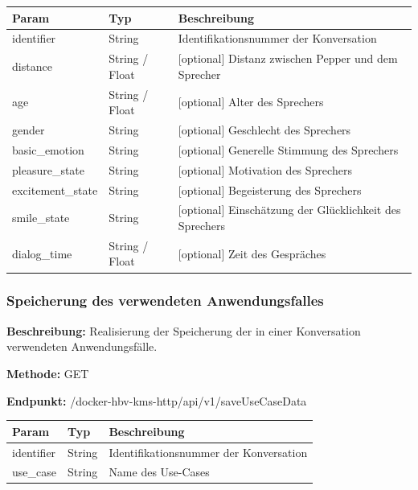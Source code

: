 \begin{table}[H]
    \setlength{\tabcolsep}{3pt}
    \begin{tabular}{p{100pt}p{80pt}p{200pt}}
        \hline
        Param             & Typ            & Beschreibung                                            \\
        \hline
        identifier        & String         & Identifikationsnummer der Konversation                  \\
        distance          & String / Float & [optional] Distanz zwischen Pepper und dem Sprecher     \\
        age               & String / Float & [optional] Alter des Sprechers                          \\
        gender            & String         & [optional] Geschlecht des Sprechers                     \\
        basic\_emotion    & String         & [optional] Generelle Stimmung des Sprechers             \\
        pleasure\_state   & String         & [optional] Motivation des Sprechers                     \\
        excitement\_state & String         & [optional] Begeisterung des Sprechers                   \\
        smile\_state      & String         & [optional] Einschätzung der Glücklichkeit des Sprechers \\
        dialog\_time      & String / Float & [optional] Zeit des Gespräches                          \\
        \hline
    \end{tabular}
\end{table}

\dotfill

\subsubsection{Speicherung des verwendeten Anwendungsfalles}
\label{sec:api-saveUseCaseData}
\textbf{Beschreibung:} Realisierung der Speicherung der in einer Konversation verwendeten Anwendungsfälle.

\textbf{Methode:} GET

\textbf{Endpunkt:} /docker-hbv-kms-http/api/v1/saveUseCaseData

\begin{table}[H]
    \label{table:/docker-hbv-kms-http/api/v1/saveUseCaseData}
    \setlength{\tabcolsep}{3pt}
    \begin{tabular}{p{100pt}p{80pt}p{200pt}}
        \hline
        Param      & Typ    & Beschreibung                           \\
        \hline
        identifier & String & Identifikationsnummer der Konversation \\
        use\_case  & String & Name des Use-Cases                     \\
        \hline
    \end{tabular}
\end{table}

